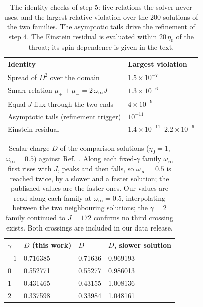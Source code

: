 \documentclass[twocolumn,floatfix,aps,prd,superscriptaddress,nofootinbib]{revtex4-2}
\begin{document}
\begin{table}[t]
\caption{The identity checks of step 5: five relations the solver never uses, and the largest relative violation over the 200 solutions of the two families. The asymptotic tails drive the refinement of step 4. The Einstein residual is evaluated within $20\,\eta_0$ of the throat; its spin dependence is given in the text.}
\label{tab:gates}
\scriptsize
\begin{ruledtabular}
\begin{tabular}{ll}
Identity & Largest violation \\
\hline
Spread of $D^2$ over the domain & $1.5\times10^{-7}$ \\
Smarr relation $\mu_++\mu_-=2\,\omega_\infty J$ & $1.3\times10^{-6}$ \\
Equal $J$ flux through the two ends & $4\times10^{-9}$ \\
Asymptotic tails (refinement trigger) & $10^{-11}$ \\
Einstein residual & $1.4{\times}10^{-11}$--$2.2{\times}10^{-6}$ \\
\end{tabular}
\end{ruledtabular}
\end{table}

\begin{table}[t]
\caption{Scalar charge $D$ of the comparison solutions ($\eta_0=1$, $\omega_\infty=0.5$) against Ref.~\cite{chew2016}. Along each fixed-$\gamma$ family $\omega_\infty$ first rises with $J$, peaks and then falls, so $\omega_\infty=0.5$ is reached twice, by a slower and a faster solution; the published values are the faster ones. Our values are read along each family at $\omega_\infty=0.5$, interpolating between the two neighbouring solutions; the $\gamma=2$ family continued to $J=172$ confirms no third crossing exists. Both crossings are included in our data release.}
\label{tab:anchors}
\scriptsize
\begin{ruledtabular}
\begin{tabular}{llll}
$\gamma$ & $D$ (this work) & $D$~\cite{chew2016} & $D$, slower solution \\
\hline
$-1$ & 0.716385 & 0.71636 & 0.969193 \\
$0$  & 0.552771 & 0.55277 & 0.986013 \\
$1$  & 0.431465 & 0.43155 & 1.008136 \\
$2$  & 0.337598 & 0.33984 & 1.048161 \\
\end{tabular}
\end{ruledtabular}
\end{table}
\end{document}
